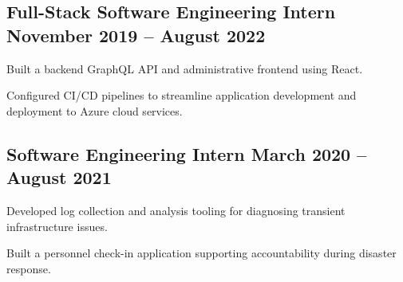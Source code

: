 \subsection{{Full-Stack Software Engineering Intern \hfill November 2019 -- August 2022}}
\begin{zitemize}
    \item Built a backend GraphQL API and administrative frontend using React.
    \item Configured CI/CD pipelines to streamline application development and
          deployment to Azure cloud services.
\end{zitemize}

\subsection{{Software Engineering Intern \hfill March 2020 -- August 2021}}
\begin{zitemize}
    \item Developed log collection and analysis tooling for diagnosing
          transient infrastructure issues.
    \item Built a personnel check-in application supporting accountability
          during disaster response.
\end{zitemize}
